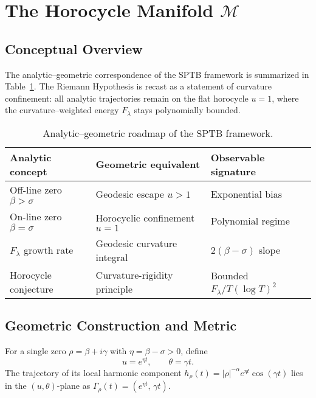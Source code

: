 
\section{The Horocycle Manifold \texorpdfstring{$\mathcal{M}$}{M}}

\subsection{Conceptual Overview}

The analytic--geometric correspondence of the SPTB framework is summarized in
Table~\ref{tab:roadmap}.  The Riemann Hypothesis is recast as a statement of
curvature confinement: all analytic trajectories remain on the flat
horocycle $u=1$, where the curvature--weighted energy $F_\lambda$ stays
polynomially bounded.

\begin{table}[h]
\centering
\caption{Analytic--geometric roadmap of the SPTB framework.}
\label{tab:roadmap}
\begin{tabular}{lll}
\toprule
Analytic concept & Geometric equivalent & Observable signature \\
\midrule
Off-line zero $\beta>\sigma$ & Geodesic escape $u>1$ & Exponential bias \\
On-line zero $\beta=\sigma$  & Horocyclic confinement $u=1$ & Polynomial regime \\
$F_\lambda$ growth rate & Geodesic curvature integral & $2(\beta-\sigma)$ slope \\
Horocycle conjecture & Curvature-rigidity principle & Bounded $F_\lambda/T(\log T)^2$ \\
\bottomrule
\end{tabular}
\end{table}

\subsection{Geometric Construction and Metric}

For a single zero $\rho=\beta+i\gamma$ with $\eta=\beta-\sigma>0$,
define
\[
u = e^{\eta t}, \qquad \theta = \gamma t .
\]
The trajectory of its local harmonic component
$h_\rho(t)=|\rho|^{-\alpha} e^{\eta t}\cos(\gamma t)$
lies in the $(u,\theta)$-plane as
$\Gamma_\rho(t)=(e^{\eta t},\,\gamma t)$.

